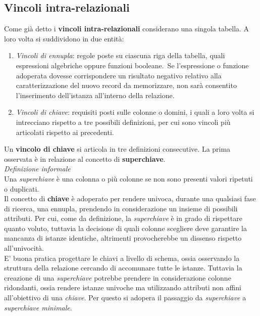 \documentclass{article}
\begin{document}
\subsection*{Vincoli intra-relazionali}
\large
Come già detto i \textbf{vincoli intra-relazionali} considerano una singola tabella. A loro volta si suddividono in due entità:
\begin{enumerate}
    \renewcommand{\labelenumi}{-}
    \item \textit{Vincoli di ennupla}: regole poste su ciascuna riga della tabella, quali espressioni algebriche oppure funzioni booleane.\ Se l'espressione o funzione adoperata dovesse corrispondere un risultato negativo relativo alla caratterizzazione del nuovo record da memorizzare, non sarà consentito l'inserimento dell'istanza all'interno della relazione.
    \item \textit{Vincoli di chiave}: requisiti posti sulle colonne o domini, i quali a loro volta si intrecciano rispetto a tre possibili definizioni, per cui sono vincoli più articolati rispetto ai precedenti.
\end{enumerate}
Un \textbf{vincolo di chiave} si articola in tre definizioni consecutive. La prima osservata è in relazione al concetto di \textbf{superchiave}.\vspace{14pt}\\
\textit{Definizione informale}\\ Una \textit{superchiave} è una colonna o più colonne se non sono presenti valori ripetuti o duplicati.\vspace{14pt}\\
Il concetto di \textbf{chiave} è adoperato per rendere univoca, durante una qualsiasi fase di ricerca, una ennupla, prendendo in considerazione un insieme di possibili attributi. Per cui, come da definizione, la \textit{superchiave} è in grado di rispettare quanto voluto, tuttavia la decisione di quali colonne scegliere deve garantire la mancanza di istanze identiche, altrimenti provocherebbe un dissenso rispetto all'univocità.\\
E' buona pratica progettare le chiavi a livello di schema, ossia osservando la struttura della relazione cercando di accomunare tutte le istanze. Tuttavia la creazione di una \textit{superchiave} potrebbe prendere in considerazione colonne ridondanti, ossia rendere istanze univoche ma utilizzando attributi non affini all'obiettivo di una \textit{chiave}. Per questo si adopera il passaggio da \textit{superchiave} a \textit{superchiave minimale}.\vspace{14pt}\\
\end{document}
